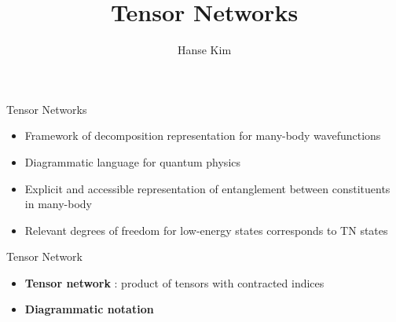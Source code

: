 \documentclass{beamer}
\title{Tensor Networks}
\author{Hanse Kim}
\begin{document}
\begin{frame}
  \titlepage
\end{frame}

\begin{frame}{Tensor Networks}
	\begin{itemize}
	\item Framework of decomposition representation for many-body wavefunctions
	\item Diagrammatic language for quantum physics
	\item Explicit and accessible representation of entanglement between constituents in many-body
	\item Relevant degrees of freedom for low-energy states corresponds to TN states
	\end{itemize}	
\end{frame}

\begin{frame}{Tensor Network}
	\begin{itemize}
	\item \textbf{Tensor network} : product of tensors with contracted indices
	\item \textbf{Diagrammatic notation}
	\\
	\end{itemize}
\end{frame}
\end{document}
